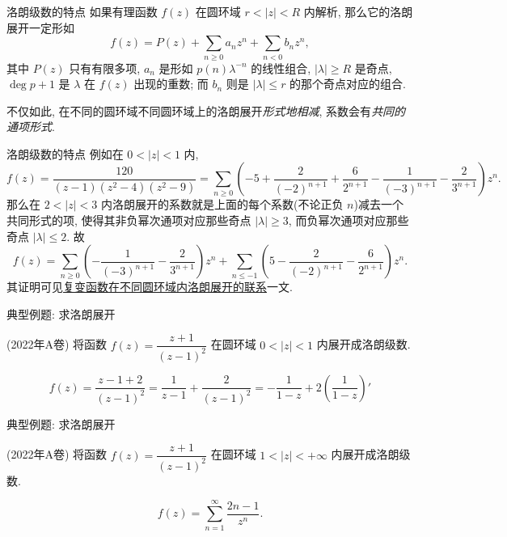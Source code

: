 \begin{frame}{洛朗级数的特点\noexer}
	\onslide<+->
	如果有理函数 $f(z)$ 在圆环域 $r<|z|<R$ 内解析, 那么它的洛朗展开一定形如
	\[f(z)=P(z)+\sum_{n\ge 0}a_n z^n+\sum_{n<0}b_n z^n,\]
	其中 $P(z)$ 只有有限多项, 
	\onslide<+->
	$a_n$ 是形如 $p(n)\lambda^{-n}$ 的线性组合, $|\lambda|\ge R$ 是奇点, $\deg p+1$ 是 $\lambda$ 在 $f(z)$ 出现的重数; 而 $b_n$ 则是 $|\lambda|\le r$ 的那个奇点对应的组合.

	\onslide<+->
	不仅如此, 在不同的圆环域不同圆环域上的洛朗展开{\itshape 形式地相减}, 系数会有\emph{共同的通项形式}.
\end{frame}


\begin{frame}{洛朗级数的特点\noexer}
	\onslide<+->
	例如在 $0<|z|<1$ 内,
	\[f(z)=\frac{120}{(z-1)(z^2-4)(z^2-9)}=\sum_{n\ge 0}\left(-5+\frac2{(-2)^{n+1}}+\frac6{2^{n+1}}-\frac1{(-3)^{n+1}}-\frac2{3^{n+1}}\right)z^n.\]
	\onslide<+->
	那么在 $2<|z|<3$ 内洛朗展开的系数就是上面的每个系数(不论正负 $n$)减去一个共同形式的项, 使得其非负幂次通项对应那些奇点 $|\lambda|\ge 3$, 而负幂次通项对应那些奇点 $|\lambda|\le2$.
	\onslide<+->
	故
	\[f(z)=\sum_{n\ge 0}\left(-\frac1{(-3)^{n+1}}-\frac2{3^{n+1}}\right)z^n+\sum_{n\le-1}\left(5-\frac2{(-2)^{n+1}}-\frac6{2^{n+1}}\right)z^n.\]
	\onslide<+->
	其证明可见\alert{\href{https://zhangshenxing.gitee.io/teaching/publications/袁志杰张神星2023 复变函数在不同圆环域内洛朗展开的联系}{复变函数在不同圆环域内洛朗展开的联系}}一文.
\end{frame}


\begin{frame}{典型例题: 求洛朗展开}
	\onslide<+->
	\begin{example}
		(2022年A卷) 将函数 $f(z)=\dfrac{z+1}{(z-1)^2}$ 在圆环域 $0<|z|<1$ 内展开成洛朗级数.
	\end{example}

	\onslide<+->
	\begin{solution}
		\[f(z)=\frac{z-1+2}{(z-1)^2}=\frac1{z-1}+\frac{2}{(z-1)^2}=-\frac1{1-z}+2\left(\frac1{1-z}\right)'\]
		\onslide<+->{因此当 $0<|z|<1$ 时,
			\[f(z)=-\sum_{n=0}^\infty z^n+2\left(\sum_{n=0}^\infty z^n\right)'=-\sum_{n=0}^\infty z^n+2\sum_{n=1}^\infty nz^{n-1}
			=\sum_{n=0}^\infty(2n+1)z^n.\]}
	\end{solution}
\end{frame}


\begin{frame}{典型例题: 求洛朗展开}
	\onslide<+->
	\begin{exercise}
		(2022年A卷) 将函数 $f(z)=\dfrac{z+1}{(z-1)^2}$ 在圆环域 $1<|z|<+\infty$ 内展开成洛朗级数.
	\end{exercise}

	\onslide<+->
	\begin{answer}
		\[f(z)=\sum_{n=1}^\infty \frac{2n-1}{z^n}.\]
	\end{answer}
\end{frame}


